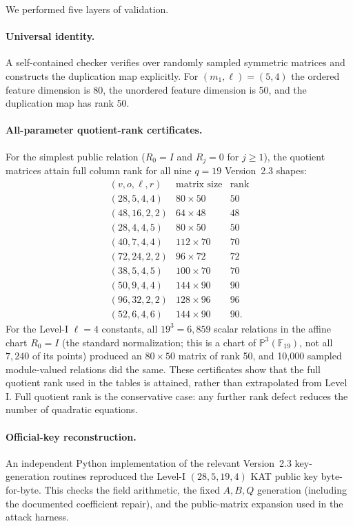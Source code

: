 \documentclass[11pt]{article}
\newcommand{\F}{\mathbb F}
\begin{document}
We performed five layers of validation.

\paragraph{Universal identity.}
A self-contained checker verifies  over randomly sampled symmetric matrices and constructs the duplication map explicitly.  For $(m_1,\ell)=(5,4)$ the ordered feature dimension is 80, the unordered feature dimension is 50, and the duplication map has rank 50.

\paragraph{All-parameter quotient-rank certificates.}
For the simplest public relation ($R_0=I$ and $R_j=0$ for $j\ge1$), the quotient matrices attain full
column rank for all nine $q=19$ Version~2.3 shapes:
\[
\begin{array}{c|c|c}
(v,o,\ell,r)&\text{matrix size}&\text{rank}\\\hline
(28,5,4,4)&80\times50&50\\
(48,16,2,2)&64\times48&48\\
(28,4,4,5)&80\times50&50\\
(40,7,4,4)&112\times70&70\\
(72,24,2,2)&96\times72&72\\
(38,5,4,5)&100\times70&70\\
(50,9,4,4)&144\times90&90\\
(96,32,2,2)&128\times96&96\\
(52,6,4,6)&144\times90&90.
\end{array}
\]
For the Level-I $\ell=4$ constants, all $19^3=6{,}859$ scalar relations in the
affine chart $R_0=I$ (the standard normalization; this is a chart of
$\mathbb P^3(\F_{19})$, not all $7{,}240$ of its points) produced an
$80\times50$ matrix of rank 50, and 10,000 sampled module-valued relations did
the same.  These certificates show that the
full quotient rank used in the tables is attained, rather than extrapolated from
Level I.  Full quotient rank is the conservative case: any further rank defect
reduces the number of quadratic equations.

\paragraph{Official-key reconstruction.}
An independent Python implementation of the relevant Version~2.3 key-generation routines reproduced the Level-I $(28,5,19,4)$ KAT public key byte-for-byte.  This checks the field arithmetic, the fixed $A,B,Q$ generation (including the documented coefficient repair), and the public-matrix expansion used in the attack harness.
\end{document}

